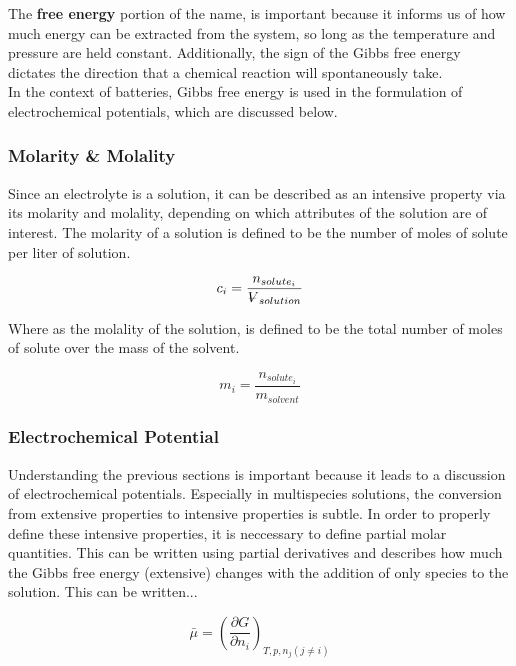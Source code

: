 \documentclass[lettersize,journal]{IEEEtran}
\newcommand{\volume}{{\ooalign{\hfil$V$\hfil\cr\kern0.08em--\hfil\cr}}}
\begin{document}
 The \textbf{free energy} portion of the name, is important because it informs us of how much energy can be extracted from the system, so long as the temperature and pressure are held constant. Additionally, the sign of the Gibbs free energy dictates the direction that a chemical reaction will spontaneously take. \\

 In the context of batteries, Gibbs free energy is used in the formulation of electrochemical potentials, which are discussed below.\\


 \subsubsection{Molarity \& Molality}

 Since an electrolyte is a solution, it can be described as an intensive property via its molarity and molality, depending on which attributes of the solution are of interest. The molarity of a solution is defined to be the number of moles of solute per liter of solution.

\begin{equation}\label{molarity}
    c_i = \frac{n_{solute_i}}{{\volume}_{solution}}
\end{equation}


 \noindent Where as the molality of the solution, is defined to be the total number of moles of solute over the mass of the solvent.

 \begin{equation}\label{molality}
     m_i = \frac{n_{solute_i}}{m_{solvent}}
 \end{equation}

 \subsubsection{Electrochemical Potential}

 Understanding the previous sections is important because it leads to a discussion of electrochemical potentials. Especially in multispecies solutions, the conversion from extensive properties to intensive properties is subtle. In order to properly define these intensive properties, it is neccessary to define partial molar quantities. This can be written using partial derivatives and describes how much the Gibbs free energy (extensive) changes with the addition of only species to the solution. This can be written...

 \begin{equation}\label{electrochemical_potential}
     \bar{\mu} = \left( \frac{\partial G}{\partial n_{i}} \right)_{T,p,n_{j} (j \neq i)}
 \end{equation}
\end{document}
